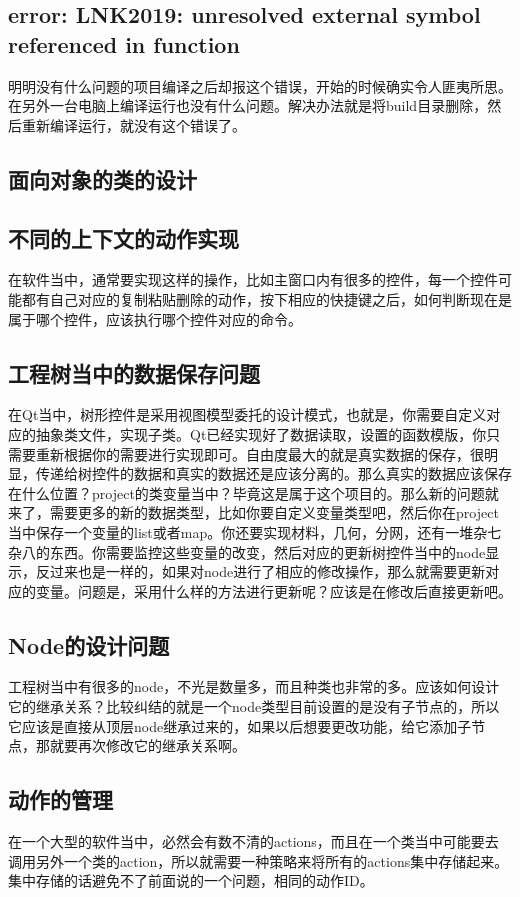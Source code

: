 \subsection{error: LNK2019: unresolved external symbol referenced in function}

明明没有什么问题的项目编译之后却报这个错误，开始的时候确实令人匪夷所思。在另外一台电脑上编译运行也没有什么问题。解决办法就是将build目录删除，然后重新编译运行，就没有这个错误了。

\subsection{面向对象的类的设计}

\subsection{不同的上下文的动作实现}
在软件当中，通常要实现这样的操作，比如主窗口内有很多的控件，每一个控件可能都有自己对应的复制粘贴删除的动作，按下相应的快捷键之后，如何判断现在是属于哪个控件，应该执行哪个控件对应的命令。

\subsection{工程树当中的数据保存问题}
在Qt当中，树形控件是采用视图模型委托的设计模式，也就是，你需要自定义对应的抽象类文件，实现子类。Qt已经实现好了数据读取，设置的函数模版，你只需要重新根据你的需要进行实现即可。自由度最大的就是真实数据的保存，很明显，传递给树控件的数据和真实的数据还是应该分离的。那么真实的数据应该保存在什么位置？project的类变量当中？毕竟这是属于这个项目的。那么新的问题就来了，需要更多的新的数据类型，比如你要自定义变量类型吧，然后你在project当中保存一个变量的list或者map。你还要实现材料，几何，分网，还有一堆杂七杂八的东西。你需要监控这些变量的改变，然后对应的更新树控件当中的node显示，反过来也是一样的，如果对node进行了相应的修改操作，那么就需要更新对应的变量。问题是，采用什么样的方法进行更新呢？应该是在修改后直接更新吧。
\subsection{Node的设计问题}
工程树当中有很多的node，不光是数量多，而且种类也非常的多。应该如何设计它的继承关系？比较纠结的就是一个node类型目前设置的是没有子节点的，所以它应该是直接从顶层node继承过来的，如果以后想要更改功能，给它添加子节点，那就要再次修改它的继承关系啊。
\subsection{动作的管理}
在一个大型的软件当中，必然会有数不清的actions，而且在一个类当中可能要去调用另外一个类的action，所以就需要一种策略来将所有的actions集中存储起来。集中存储的话避免不了前面说的一个问题，相同的动作ID。
